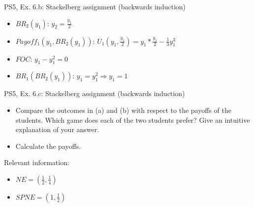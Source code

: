 \begin{frame}{PS5, Ex. 6.b: Stackelberg assignment (backwards induction)}
\begin{multicols}{2}
\begin{itemize}
        \item[4] $BR_2(y_1)$: $y_2 = \frac{y_1}{2}$ \\
        \item[5] $Payoff_1(y_1,BR_2(y_1))$: $U_1(y_1,\frac{y_1}{2}) = y_1*\frac{y_1}{2}-\frac{1}{3}y_1^3$ \\
        \item[6] $FOC$: $y_1 - y_1^2 = 0$ \\
        \item[7] $BR_1(BR_2(y_1))$: $y_1 = y_1^2 \Rightarrow y_1=1$ \\
    \end{itemize}
    \vfill\null
  \end{multicols}
\end{frame}

\begin{frame}{PS5, Ex. 6.c: Stackelberg assignment (backwards induction)}
  \begin{itemize}
    \item[(c)] Compare the outcomes in (a) and (b) with respect to the payoffs of the students. Which game does each of the two students prefer? Give an intuitive explanation of your answer.
  \end{itemize}
  \begin{multicols}{2}
    \begin{itemize}
        \item[(Step 1)] Calculate the payoffs.
    \end{itemize}
    \vfill\null \columnbreak
    Relevant information:
    \begin{itemize}
        \item[(a)] \begin{math} NE=\left(\frac{1}{2},\frac{1}{4}\right)\end{math}
        \item[(b)] \begin{math} SPNE=\left(1,\frac{1}{2}\right)\end{math}
    \end{itemize}
  \end{multicols}
\end{frame}
